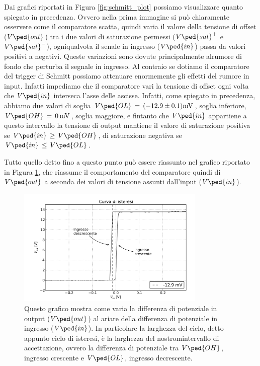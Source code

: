 Dai grafici riportati in Figura \ref{fig:schmitt_plot} possiamo visualizzare quanto spiegato in precedenza. Ovvero nella prima immagine si può chiaramente osservere come il comparatore scatta, quindi varia il valore della tensione di offset ($V\ped{out}$) tra i due valori di saturazione permessi ($V\ped{sat}^+$ e $V\ped{sat}^-$), ogniqualvota il senale in ingresso ($V\ped{in}$) passa da valori positivi a negativi. Queste variazioni sono dovute principalmente alrumore di fondo che perturba il segnale in ingresso. Al contraio se dotiamo il comparatore del trigger di Schmitt possiamo attenuare enormemente gli effetti del rumore in input. Infatti impediamo che il comparatore vari la tensione di offset ogni volta che $V\ped{in}$ interseca l'asse delle ascisse.
Infatti, come spiegato in precedenza, abbiamo due valori di soglia $V\ped{OL}\,=\,(-12.9\pm0.1)\SI{}{\milli\volt}$, soglia inferiore, $V\ped{OH}\,=\,\SI{0}{\milli\volt}$, soglia maggiore, e fintanto che $V\ped{in}$ appartiene a questo intervallo la tensione di output mantiene il valore di saturazione positiva se $V\ped{in}\,\geq\,V\ped{OH}$, di saturazione negativa se $V\ped{in}\,\leq\,V\ped{OL}$.

Tutto quello detto fino a questo punto può essere riassunto nel grafico riportato in Figura \ref{fig:isteresi_plot}, che riassume il comportamento del comparatore quindi di $V\ped{out}$ a seconda dei valori di tensione assunti dall'input ($V\ped{in}$).

\begin{figure}
    \centering
    \includegraphics[width=0.8\textwidth]{figure/isteresi.pdf}
    \caption{Questo grafico mostra come varia la differenza di potenziale in output ($V\ped{out}$) al ariare della differenza di potenziale in ingresso ($V\ped{in}$). In particolare la larghezza del ciclo, detto appunto ciclo di isteresi, è la larghezza del nostromintervallo di accettazione, ovvero la differenza di potenziale tra $V\ped{OH}$, ingresso crescente e $V\ped{OL}$, ingresso decrescente.}
    \label{fig:isteresi_plot}
\end{figure}

